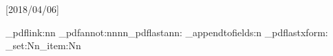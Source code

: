%
%
%
%
%
%
%
%
%
%
%
%
\usepackage{pdfbase}[2018/04/06]
\usepackage{xparse,ocgbase}
\usepackage{xcolor,calc}
\usepackage{tikzpagenodes,linegoal}
\usetikzlibrary{calc}

\ExplSyntaxOn
\let\tpPdfLink\pbs_pdflink:nn
\let\tpPdfAnnot\pbs_pdfannot:nnnn\let\tpPdfLastAnn\pbs_pdflastann:
\let\tpAppendToFields\pbs_appendtofields:n
\def\tpPdfXform{\pbs_pdfxform:nnnnn{1}{1}{}{}}
\let\tpPdfLastXform\pbs_pdflastxform:
\let\cListSet\clist_set:Nn\let\cListItem\clist_item:Nn
\ExplSyntaxOff

\makeatletter

